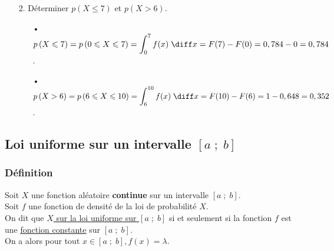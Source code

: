 \begin{itemize}
\item[2.] Déterminer $p\left(X \leqslant 7\right)$ et $p\left(X > 6\right)$. \\

\begin{itemize}
\item[•] $p\left(X \leqslant 7\right) = p\left(0 \leqslant X \leqslant 7\right) = \displaystyle{\int_0^7 f(x) \; \diff x} = F(7) - F(0) = 0,784 - 0 = 0,784$. \\

\vspace*{.3cm}

\item[•] $p\left(X > 6\right) = p\left(6 \leqslant X \leqslant 10\right) = \displaystyle{\int_6^{10} f(x) \; \diff x} = F(10) - F(6) = 1 - 0,648 = 0,352$.
\end{itemize}
\end{itemize}




\newpage

\subsection{Loi uniforme sur un intervalle $\left[a \; ; \; b\right]$}

\subsubsection{Définition}

Soit $X$ une fonction aléatoire \textbf{continue} sur un intervalle $\left[a \; ; \; b\right]$. \\
Soit $f$ une fonction de densité de la loi de probabilité $X$. \\

On dit que \underline{$X$ sur la loi uniforme sur $\left[a \; ; \; b\right]$} si et seulement si la fonction $f$ est une \underline{fonction constante} sur $\left[a \; ; \; b\right]$. \\

On a alors pour tout $x \in \left[a \; ; \; b\right], f(x) = \lambda$. \\

